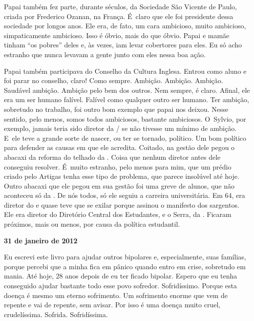 Papai também fez parte, durante séculos, da Sociedade São Vicente de
Paulo, criada por Frederico Ozanan, na França. É~claro que ele foi
presidente dessa sociedade por longos anos. Ele era, de fato, um cara
ambicioso, muito ambicioso, simpaticamente ambicioso. Isso é óbvio, mais
do que óbvio. Papai e mamãe tinham ``os pobres'' deles e, às vezes, iam
levar cobertores para eles. Eu só acho estranho que nunca levavam a
gente junto com eles nessa boa ação.

Papai também participava do Conselho da Cultura Inglesa. Entrou como
aluno e foi parar no conselho, claro! Como sempre. Ambição. Ambição.
Ambição. Saudável ambição. Ambição pelo bem dos outros. Nem sempre, é
claro. Afinal, ele era um ser humano falível. Falível como qualquer
outro ser humano. Ter ambição, sobretudo no trabalho, foi outro bom
exemplo que papai nos deixou. Nesse sentido, pelo menos, somos todos
ambiciosos, bastante ambiciosos. O~Sylvio, por exemplo, jamais teria
sido diretor da / se não tivesse um mínimo de ambição. E~ele teve
a grande sorte de nascer, ou ter se tornado, político. Um bom político
para defender as causas em que ele acredita. Coitado, na gestão dele
pegou o abacaxi da reforma do telhado da . Coisa que nenhum diretor
antes dele conseguiu resolver. É~muito estranho, pelo menos para mim,
que um prédio criado pelo Artigas tenha esse tipo de problema, que
parece insolúvel até hoje. Outro abacaxi que ele pegou em sua gestão foi
uma greve de alunos, que não aconteceu só da . De nós todos, só ele
seguiu a carreira universitária. Em 64, era diretor do  e quase teve
que se exilar porque assinou o manifesto dos sargentos. Ele era diretor
do Diretório Central dos Estudantes, e o Serra, da . Ficaram
próximos, mais ou menos, por causa da política estudantil.

\begin{center}\asterisc{}\end{center}

\begin{flushright}\textbf{31 de janeiro de 2012}\end{flushright}


Eu escrevi este livro para ajudar outros bipolares e, especialmente,
suas famílias, porque percebi que a minha fica em pânico quando entro em
crise, sobretudo em mania. Até hoje, 28 anos depois de eu ter ficado
bipolar. Espero que eu tenha conseguido ajudar bastante todo esse povo
sofredor. Sofridíssimo. Porque esta doença é mesmo um eterno sofrimento.
Um sofrimento enorme que vem de repente e vai de repente, sem avisar.
Por isso é uma doença muito cruel, crudelíssima. Sofrida. Sofridíssima.

